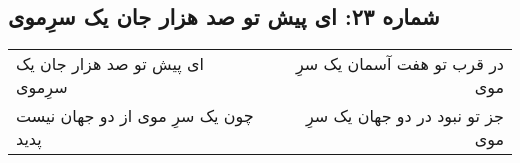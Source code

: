 \begin{center}
\section*{شماره ۲۳: ای پیش تو صد هزار جان یک سرِ‌موی}
\label{sec:023}
\begin{longtable}{l p{0.5cm} r}
ای پیش تو صد هزار جان یک سرِ‌موی
&&
در قرب تو هفت آسمان یک سرِ موی
\\
چون یک سرِ موی از دو جهان نیست پدید
&&
جز تو نبود در دو جهان یک سرِ موی
\\
\end{longtable}
\end{center}
